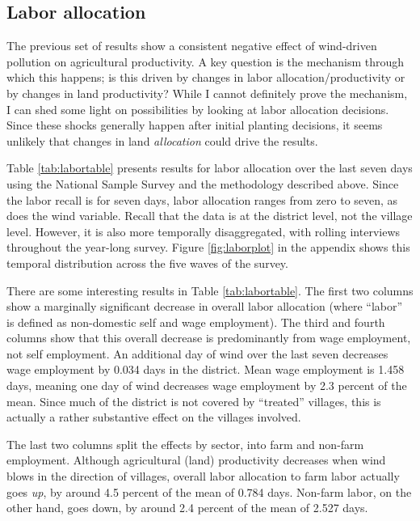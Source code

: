 \documentclass[
]{article}
\begin{document}
\hypertarget{labor-allocation}{%
\subsection{Labor allocation}\label{labor-allocation}}

The previous set of results show a consistent negative effect of wind-driven pollution on agricultural productivity. A key question is the mechanism through which this happens; is this driven by changes in labor allocation/productivity or by changes in land productivity? While I cannot definitely prove the mechanism, I can shed some light on possibilities by looking at labor allocation decisions. Since these shocks generally happen after initial planting decisions, it seems unlikely that changes in land \emph{allocation} could drive the results.

Table \ref{tab:labortable} presents results for labor allocation over the last seven days using the National Sample Survey and the methodology described above. Since the labor recall is for seven days, labor allocation ranges from zero to seven, as does the wind variable. Recall that the data is at the district level, not the village level. However, it is also more temporally disaggregated, with rolling interviews throughout the year-long survey. Figure \ref{fig:laborplot} in the appendix shows this temporal distribution across the five waves of the survey.

There are some interesting results in Table \ref{tab:labortable}. The first two columns show a marginally significant decrease in overall labor allocation (where ``labor'' is defined as non-domestic self and wage employment). The third and fourth columns show that this overall decrease is predominantly from wage employment, not self employment. An additional day of wind over the last seven decreases wage employment by 0.034 days in the district. Mean wage employment is 1.458 days, meaning one day of wind decreases wage employment by 2.3 percent of the mean. Since much of the district is not covered by ``treated'' villages, this is actually a rather substantive effect on the villages involved.

The last two columns split the effects by sector, into farm and non-farm employment. Although agricultural (land) productivity decreases when wind blows in the direction of villages, overall labor allocation to farm labor actually goes \emph{up}, by around 4.5 percent of the mean of 0.784 days. Non-farm labor, on the other hand, goes down, by around 2.4 percent of the mean of 2.527 days.
\end{document}
